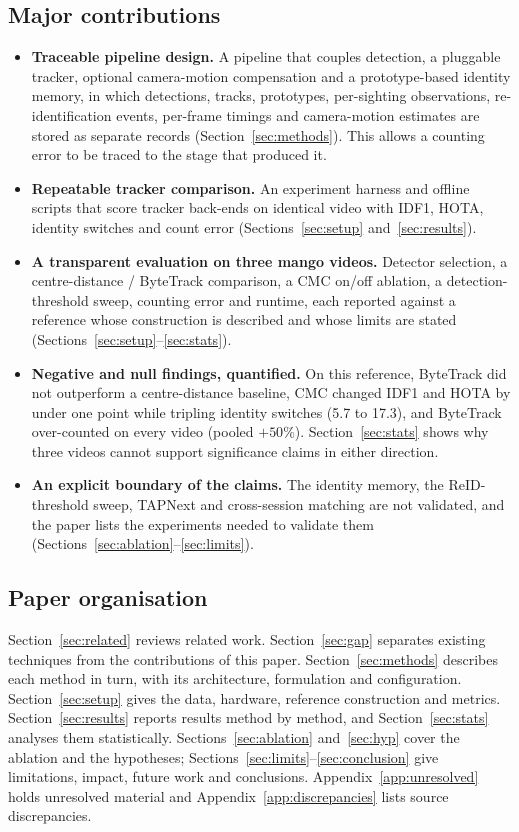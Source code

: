 \documentclass[11pt,a4paper]{article}
\begin{document}
\subsection{Major contributions}
\begin{itemize}
\item \textbf{Traceable pipeline design.} A pipeline that couples detection, a pluggable tracker, optional camera-motion compensation and a prototype-based identity memory, in which detections, tracks, prototypes, per-sighting observations, re-identification events, per-frame timings and camera-motion estimates are stored as separate records (Section~\ref{sec:methods}). This allows a counting error to be traced to the stage that produced it.
\item \textbf{Repeatable tracker comparison.} An experiment harness and offline scripts that score tracker back-ends on identical video with IDF1, HOTA, identity switches and count error (Sections~\ref{sec:setup} and~\ref{sec:results}).
\item \textbf{A transparent evaluation on three mango videos.} Detector selection, a centre-distance / ByteTrack comparison, a CMC on/off ablation, a detection-threshold sweep, counting error and runtime, each reported against a reference whose construction is described and whose limits are stated (Sections~\ref{sec:setup}--\ref{sec:stats}).
\item \textbf{Negative and null findings, quantified.} On this reference, ByteTrack did not outperform a centre-distance baseline, CMC changed IDF1 and HOTA by under one point while tripling identity switches (5.7 to 17.3), and ByteTrack over-counted on every video (pooled $+50\%$). Section~\ref{sec:stats} shows why three videos cannot support significance claims in either direction.
\item \textbf{An explicit boundary of the claims.} The identity memory, the ReID-threshold sweep, TAPNext and cross-session matching are not validated, and the paper lists the experiments needed to validate them (Sections~\ref{sec:ablation}--\ref{sec:limits}).
\end{itemize}

\subsection{Paper organisation}
Section~\ref{sec:related} reviews related work. Section~\ref{sec:gap} separates existing techniques from the contributions of this paper. Section~\ref{sec:methods} describes each method in turn, with its architecture, formulation and configuration. Section~\ref{sec:setup} gives the data, hardware, reference construction and metrics. Section~\ref{sec:results} reports results method by method, and Section~\ref{sec:stats} analyses them statistically. Sections~\ref{sec:ablation} and~\ref{sec:hyp} cover the ablation and the hypotheses; Sections~\ref{sec:limits}--\ref{sec:conclusion} give limitations, impact, future work and conclusions. Appendix~\ref{app:unresolved} holds unresolved material and Appendix~\ref{app:discrepancies} lists source discrepancies.
\end{document}
